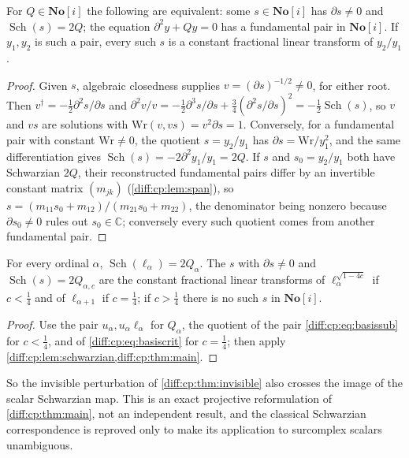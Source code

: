 \documentclass[11pt,letterpaper]{article}
\numberwithin{equation}{section}
\theoremstyle{definition}
\theoremstyle{remark}
\newcommand{\SC}{\mathbf{No}[i]}
\newcommand{\C}{\mathbb C}
\newcommand{\der}{\partial}
\newcommand{\Sch}{\operatorname{Sch}}
\begin{document}
\begin{lemma}
\label{diff:cp:lem:schwarzian}
For $Q\in\SC$ the following are equivalent: some $s\in\SC$ has $\der s\neq0$ and
$\Sch(s)=2Q$; the equation $\der^{2}y+Qy=0$ has a fundamental pair in $\SC$. If
$y_{1},y_{2}$ is such a pair, every such $s$ is a constant fractional linear
transform of $y_{2}/y_{1}$.
\end{lemma}
\begin{proof}
Given $s$, algebraic closedness supplies $v=(\der s)^{-1/2}\neq0$, for either
root. Then $v^{\dagger}=-\frac12\der^{2}s/\der s$ and
$\der^{2}v/v=-\frac12\der^{3}s/\der s+\frac34(\der^{2}s/\der s)^{2}=-\frac12\Sch(s)$,
so $v$ and $vs$ are solutions with $\mathrm{Wr}(v,vs)=v^{2}\der s=1$.
Conversely, for a fundamental pair with constant $\mathrm{Wr}\neq0$, the
quotient $s=y_{2}/y_{1}$ has $\der s=\mathrm{Wr}/y_{1}^{2}$, and the same
differentiation gives $\Sch(s)=-2\der^{2}y_{1}/y_{1}=2Q$. If $s$ and
$s_{0}=y_{2}/y_{1}$ both have Schwarzian $2Q$, their reconstructed fundamental
pairs differ by an invertible constant matrix $(m_{jk})$
(\cref{diff:cp:lem:span}), so $s=(m_{11}s_{0}+m_{12})/(m_{21}s_{0}+m_{22})$, the
denominator being nonzero because
$\der s_{0}\neq0$ rules out $s_{0}\in\C$; conversely every such quotient comes
from another fundamental pair.
\end{proof}

\begin{corollary}
\label{diff:cp:cor:schwarzian}
For every ordinal $\alpha$, $\Sch(\ell_{\alpha})=2Q_{\alpha}$. The $s$ with
$\der s\neq0$ and $\Sch(s)=2Q_{\alpha,c}$ are the constant fractional linear
transforms of $\ell_{\alpha}^{\sqrt{1-4c}}$ if $c<\frac14$ and of
$\ell_{\alpha+1}$ if $c=\frac14$; if $c>\frac14$ there is no such $s$ in $\SC$.
\end{corollary}
\begin{proof}
Use the pair $u_{\alpha},u_{\alpha}\ell_{\alpha}$ for $Q_{\alpha}$, the quotient
of the pair \cref{diff:cp:eq:basissub} for $c<\frac14$, and of
\cref{diff:cp:eq:basiscrit} for $c=\frac14$; then apply
\cref{diff:cp:lem:schwarzian,diff:cp:thm:main}.
\end{proof}

So the invisible perturbation of \cref{diff:cp:thm:invisible} also crosses the
image of the scalar Schwarzian map. This is an exact projective reformulation
of \cref{diff:cp:thm:main}, not an independent result, and the classical
Schwarzian correspondence is reproved only to make its application to
surcomplex scalars unambiguous.
\end{document}
